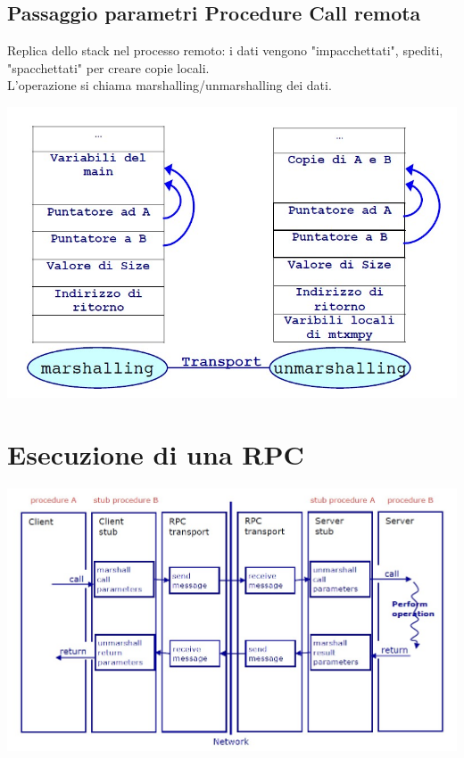 \subsection{Passaggio parametri Procedure Call remota}
Replica dello stack nel processo remoto: i dati vengono "impacchettati", spediti, "spacchettati" per creare copie locali.
\\L'operazione si chiama marshalling/unmarshalling dei dati.
\begin{center}
    \includegraphics[scale=0.5]{img/RPC_passaggioparametri3.jpg}
\end{center}

\section{Esecuzione di una RPC}
\begin{center}
    \includegraphics[scale=0.5]{img/RPC_esecuzione1.jpg}
\end{center}

